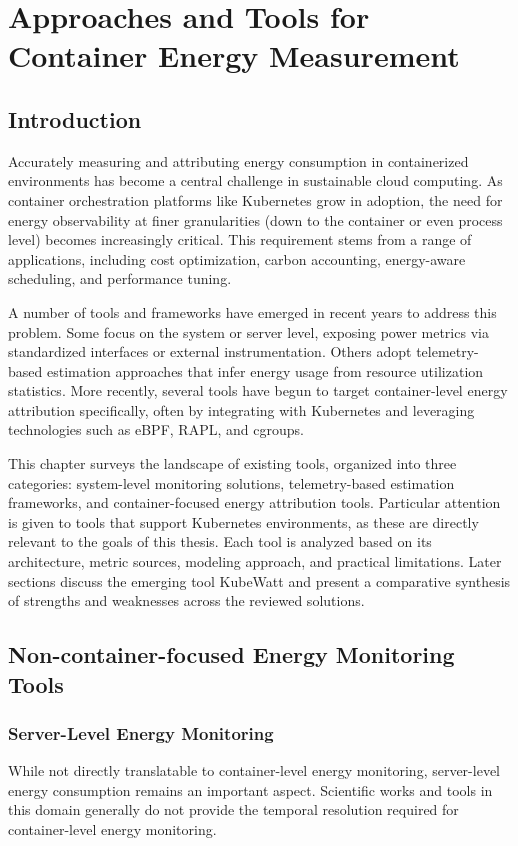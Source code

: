 \chapter{Approaches and Tools for Container Energy Measurement}
\label{Chapter4}

\section{Introduction}
\label{sec:tool-intro}

Accurately measuring and attributing energy consumption in containerized environments has become a central challenge in sustainable cloud computing. As container orchestration platforms like Kubernetes grow in adoption, the need for energy observability at finer granularities (down to the container or even process level) becomes increasingly critical. This requirement stems from a range of applications, including cost optimization, carbon accounting, energy-aware scheduling, and performance tuning.

A number of tools and frameworks have emerged in recent years to address this problem. Some focus on the system or server level, exposing power metrics via standardized interfaces or external instrumentation. Others adopt telemetry-based estimation approaches that infer energy usage from resource utilization statistics. More recently, several tools have begun to target container-level energy attribution specifically, often by integrating with Kubernetes and leveraging technologies such as eBPF, RAPL, and cgroups.

This chapter surveys the landscape of existing tools, organized into three categories: system-level monitoring solutions, telemetry-based estimation frameworks, and container-focused energy attribution tools. Particular attention is given to tools that support Kubernetes environments, as these are directly relevant to the goals of this thesis. Each tool is analyzed based on its architecture, metric sources, modeling approach, and practical limitations. Later sections discuss the emerging tool KubeWatt and present a comparative synthesis of strengths and weaknesses across the reviewed solutions.

\section{Non-container-focused Energy Monitoring Tools}
\label{sec:non-k8s-tools}
\subsection{Server-Level Energy Monitoring}
\label{sec:server-tools}
While not directly translatable to container-level energy monitoring, server-level energy consumption remains an important aspect. Scientific works and tools in this domain generally do not provide the temporal resolution required for container-level energy monitoring.

